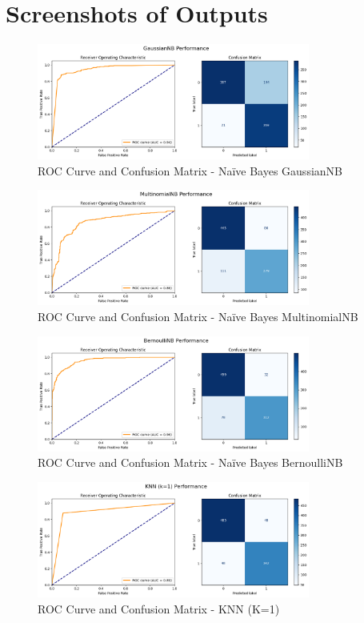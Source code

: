 \documentclass[12pt]{article}
\begin{document}
\section*{Screenshots of Outputs}

\begin{figure}[h!]
\centering
\includegraphics[width=0.8\textwidth]{images/naivebayes1.png}
\caption{ROC Curve and Confusion Matrix - Na\"ive Bayes GaussianNB}
\end{figure}

\begin{figure}[h!]
\centering
\includegraphics[width=0.8\textwidth]{images/naivebayes2.png}
\caption{ROC Curve and Confusion Matrix - Na\"ive Bayes MultinomialNB}
\end{figure}

\begin{figure}[h!]
\centering
\includegraphics[width=0.8\textwidth]{images/naivebayes3.png}
\caption{ROC Curve and Confusion Matrix - Na\"ive Bayes BernoulliNB}
\end{figure}


\begin{figure}[h!]
\centering
\includegraphics[width=0.8\textwidth]{images/knn1.png}
\caption{ROC Curve and Confusion Matrix - KNN (K=1)}
\end{figure}
\end{document}
